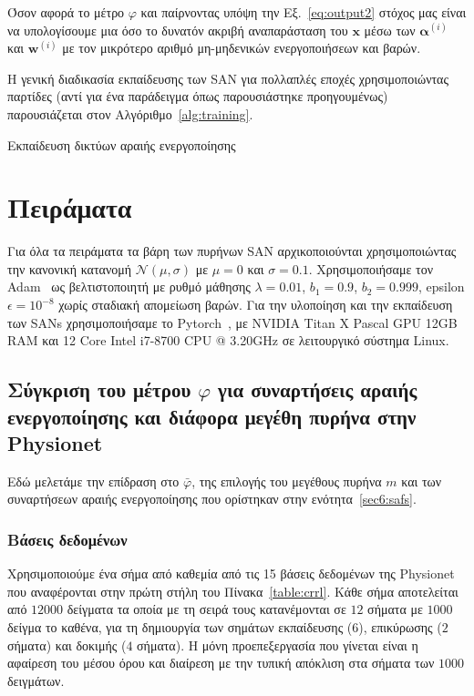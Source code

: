 Όσον αφορά το μέτρο $\varphi$ και παίρνοντας υπόψη την Εξ.~\ref{eq:output2} στόχος μας είναι να υπολογίσουμε μια όσο το δυνατόν ακριβή αναπαράσταση του $\bm{x}$ μέσω των $\bm{\alpha}^{(i)}$ και $\bm{w}^{(i)}$ με τον μικρότερο αριθμό μη-μηδενικών ενεργοποιήσεων και βαρών.

Η γενική διαδικασία εκπαίδευσης των SAN για πολλαπλές εποχές χρησιμοποιώντας παρτίδες (αντί για ένα παράδειγμα όπως παρουσιάστηκε προηγουμένως) παρουσιάζεται στον Αλγόριθμο~\ref{alg:training}.

\begin{algorithm}[H]
	\caption{Εκπαίδευση δικτύων αραιής ενεργοποίησης}
	\label{alg:training}
	
\end{algorithm}


\section{Πειράματα}
\label{sec6:experiments}
Για όλα τα πειράματα τα βάρη των πυρήνων SAN αρχικοποιούνται χρησιμοποιώντας την κανονική κατανομή $\mathcal{N} (\mu, \sigma)$ με $\mu = 0$ και $\sigma = 0.1$.
Χρησιμοποιήσαμε τον Adam~\cite{kingma2014adam} ως βελτιστοποιητή με ρυθμό μάθησης $\lambda = 0.01$, $b_1 = 0.9$, $b_2 = 0.999$, epsilon $\epsilon = 10^{-8}$ χωρίς σταδιακή απομείωση βαρών.
Για την υλοποίηση και την εκπαίδευση των SANs χρησιμοποιήσαμε το Pytorch~\cite{paszke2017automatic}, με NVIDIA Titan X Pascal GPU 12GB RAM και 12 Core Intel i7-8700 CPU @ 3.20GHz σε λειτουργικό σύστημα Linux.

\subsection{Σύγκριση του μέτρου $\varphi$ για συναρτήσεις αραιής ενεργοποίησης και διάφορα μεγέθη πυρήνα στην Physionet}
Εδώ μελετάμε την επίδραση στο $\bar\varphi$, της επιλογής του μεγέθους πυρήνα $m$ και των συναρτήσεων αραιής ενεργοποίησης που ορίστηκαν στην ενότητα~\ref{sec6:safs}.

\subsubsection{Βάσεις δεδομένων}
Χρησιμοποιούμε ένα σήμα από καθεμία από τις 15 βάσεις δεδομένων της Physionet που αναφέρονται στην πρώτη στήλη του Πίνακα~\ref{table:crrl}.
Κάθε σήμα αποτελείται από $12000$ δείγματα τα οποία με τη σειρά τους κατανέμονται σε $12$ σήματα με $1000$ δείγμα το καθένα, για τη δημιουργία των σημάτων εκπαίδευσης ($6$), επικύρωσης ($2$ σήματα) και δοκιμής ($4$ σήματα).
Η μόνη προεπεξεργασία που γίνεται είναι η αφαίρεση του μέσου όρου και διαίρεση με την τυπική απόκλιση στα σήματα των $1000$ δειγμάτων.

